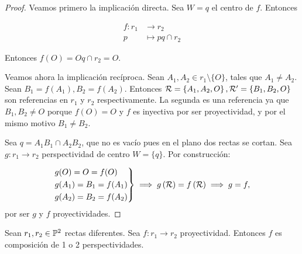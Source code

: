 \begin{proof}
    Veamos primero la implicación directa. Sea $W = {q}$
    el centro de $f$. Entonces

    \begin{align*}
    f : r_1 &\to r_2 \\
    p &\mapsto pq \cap r_2
    \end{align*}
    
    Entonces $f(O) = Oq \cap r_2 = O$.
    
    Veamos ahora la implicación recíproca. Sean $A_1, A_2 \in r_1
    \setminus \{O\}$, tales que $A_1 \neq A_2$. 
    Sean $B_1 = f(A_1), B_2 = f(A_2)$. Entonces $\mathcal{R} = \left \{ A_1, 
    A_2, O \right \}, \mathcal{R}' = \left \{ B_1, B_2, O \right \}$ son
    referencias en $r_1$ y $r_2$ respectivamente. La segunda 
    es una referencia ya que $B_1, B_2 \neq O$ porque $f(O) = O$ y
    $f$ es inyectiva por ser proyectividad, y por el mismo motivo
    $B_1 \neq B_2$.
    
    Sea $q = A_1B_1 \cap A_2B_2$, que no es vacío pues en el
    plano dos rectas se cortan. Sea $g \colon r_1 \to r_2$ 
    perspectividad de centro $W = \{ q\}$. Por construcción:
    
    \[
    \begin{rcases}
        g(O) = O = f(O) \\
        g(A_1) = B_1 = f(A_1) \\
        g(A_2) = B_2 = f(A_2)
    \end{rcases}
    \implies
    g\left( \mathcal{R}\right) = f\left( \mathcal{R} \right) \implies g = f,
    \]
    por ser $g$ y $f$ proyectividades.
\end{proof}
\begin{teo*}
    \label{primer_teo_poncelet}
    Sean $r_1, r_2 \in \mathbb{P}^2$ rectas diferentes. Sea $f \colon 
    r_1 \to r_2$ proyectividad. Entonces $f$ es composición
    de 1 o 2 perspectividades.
\end{teo*}
